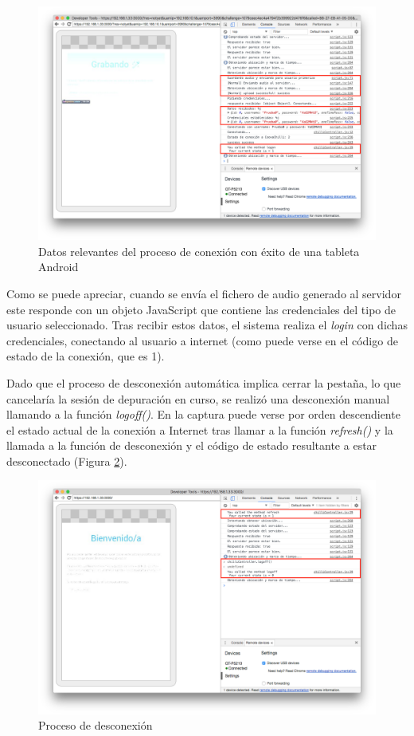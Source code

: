 \begin{figure}[!t]
\begin{center}
\includegraphics[width=0.75\linewidth]{./6_EvalEmpirica/Img/connectionChilli.png}
\end{center}
\caption{Datos relevantes del proceso de conexión con éxito de una tableta Android}
\label{connectionChilli}
\end{figure}

Como se puede apreciar, cuando se envía el fichero de audio generado al servidor este responde con un objeto JavaScript que contiene las credenciales del tipo de usuario seleccionado. Tras recibir estos datos, el sistema realiza el \emph{login} con dichas credenciales, conectando al usuario a internet (como puede verse en el código de estado de la conexión, que es 1).

Dado que el proceso de desconexión automática implica cerrar la pestaña, lo que cancelaría la sesión de depuración en curso, se realizó una desconexión manual llamando a la función \emph{logoff()}. En la captura puede verse por orden descendiente el estado actual de la conexión a Internet tras llamar a la función \emph{refresh()} y la llamada a la función de desconexión y el código de estado resultante a estar desconectado (Figura \ref{chilliDisconnect}).

\begin{figure}[!t]
\begin{center}
\includegraphics[width=0.75\linewidth]{./6_EvalEmpirica/Img/chilliDisconnect.png}
\end{center}
\caption{Proceso de desconexión}
\label{chilliDisconnect}
\end{figure}

